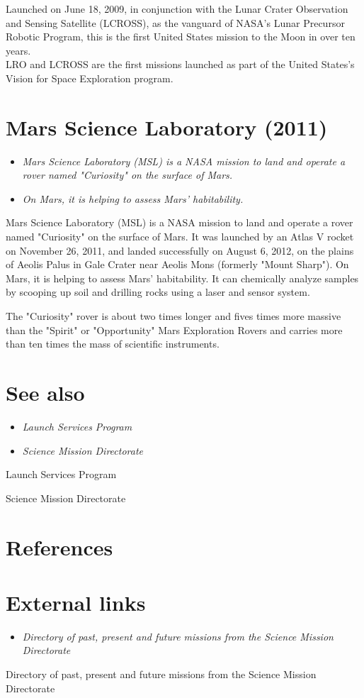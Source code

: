 Launched on June 18, 2009, in conjunction with the Lunar Crater
Observation and Sensing Satellite (LCROSS), as the vanguard of NASA's
Lunar Precursor Robotic Program, this is the first United States mission
to the Moon in over ten years.\\
LRO and LCROSS are the first missions launched as part of the United
States's Vision for Space Exploration program.

\section{Mars Science Laboratory
(2011)}\label{mars-science-laboratory-2011}

\begin{itemize}
\item
  \emph{Mars Science Laboratory (MSL) is a NASA mission to land and
  operate a rover named "Curiosity" on the surface of Mars.}
\item
  \emph{On Mars, it is helping to assess Mars' habitability.}
\end{itemize}

Mars Science Laboratory (MSL) is a NASA mission to land and operate a
rover named "Curiosity" on the surface of Mars. It was launched by an
Atlas V rocket on November 26, 2011, and landed successfully on August
6, 2012, on the plains of Aeolis Palus in Gale Crater near Aeolis Mons
(formerly "Mount Sharp"). On Mars, it is helping to assess Mars'
habitability. It can chemically analyze samples by scooping up soil and
drilling rocks using a laser and sensor system.

The "Curiosity" rover is about two times longer and fives times more
massive than the "Spirit" or "Opportunity" Mars Exploration Rovers and
carries more than ten times the mass of scientific instruments.

\section{See also}\label{see-also}

\begin{itemize}
\item
  \emph{Launch Services Program}
\item
  \emph{Science Mission Directorate}
\end{itemize}

Launch Services Program

Science Mission Directorate

\section{References}\label{references}

\section{External links}\label{external-links}

\begin{itemize}
\item
  \emph{Directory of past, present and future missions from the Science
  Mission Directorate}
\end{itemize}

Directory of past, present and future missions from the Science Mission
Directorate
